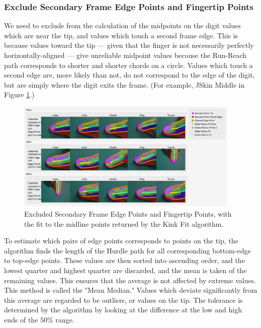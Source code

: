 \subsubsection{Exclude Secondary Frame Edge Points and Fingertip Points }\label{sec:ExcludeSecondaryFrameEdgePointsAndFingertipPoints}
We need to exclude from the calculation of the midpoints on the digit values which are near the tip, and values which touch a second frame edge. This is because values toward the tip --- given that the finger is not necessarily perfectly horizontally-aligned --- give unreliable midpoint values because the Run-Reach path corresponds to shorter and shorter chords on a circle. Values which touch a second edge are, more likely than not, do not correspond to the edge of the digit, but are simply where the digit exits the frame. (For example, JSkin Middle in Figure \ref{fig:ExcludedEdgePointsAndMidlineFit}.)

\begin{figure}[h!]
  \centering
    \includegraphics[width=0.95\textwidth]{Chapter4/Figs/ExcludedEdgePointsAndMidlineFit.jpg}
    \caption{Excluded Secondary Frame Edge Points and Fingertip Points, with the fit to the midline points returned by the Kink Fit algorithm.}\label{fig:ExcludedEdgePointsAndMidlineFit}
\end{figure}

To estimate which pairs of edge points corresponds to points on the tip, the algorithm finds the length of the Hurdle path for all corresponding bottom-edge to top-edge points. These values are then sorted into ascending order, and the lowest quarter and highest quarter are discarded, and the mean is taken of the remaining values. This ensures that the average is not affected by extreme values. This method is called the "Mean Median." Values which deviate significantly from this average are regarded to be outliers, or values on the tip. The tolerance is determined by the algorithm by looking at the difference at the low and high ends of the $50\%$ range.

